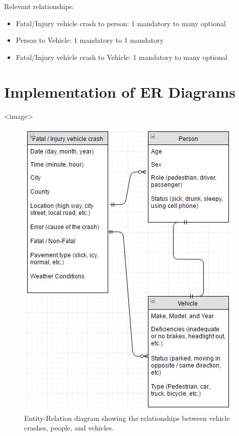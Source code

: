 \documentclass[journal]{vgtc}                %
\begin{document}
Relevant relationships:
\begin{itemize}
  \item Fatal/Injury vehicle crash to person: 1 mandatory to many optional
  \item Person to Vehicle: 1 mandatory to 1 mandatory
  \item Fatal/Injury vehicle crash to Vehicle: 1 mandatory to many optional
\end{itemize}

\section{Implementation of ER Diagrams}

<image>

\begin{figure}[tb]
 \centering %
 \includegraphics[width=\columnwidth]{ER}
 \caption{Entity-Relation diagram showing the relationships between vehicle crashes, people, and vehicles.}
 \label{fig:sample}
\end{figure}
\end{document}
